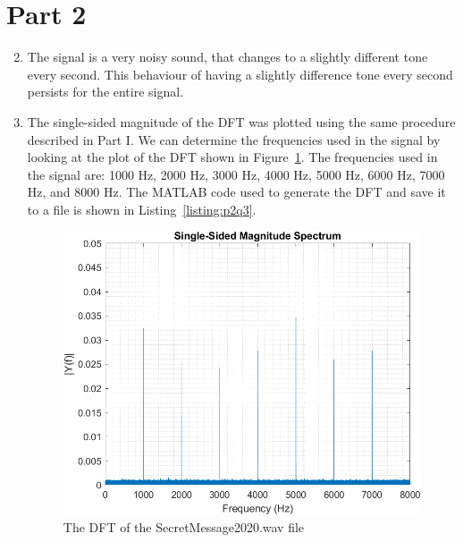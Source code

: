 \documentclass[12pt]{article}
\begin{document}
\section*{Part 2}
\begin{enumerate}
    \setcounter{enumi}{1}
    \item The signal is a very noisy sound, that changes to a slightly different tone every second. This behaviour of having a slightly difference tone every second persists for the entire signal.

    \item The single-sided magnitude of the DFT was plotted using the same procedure described in Part I. We can determine the frequencies used in the signal by looking at the plot of the DFT shown in Figure~\ref{fig:p2q3}. The frequencies used in the signal are: 1000 Hz, 2000 Hz, 3000 Hz, 4000 Hz, 5000 Hz, 6000 Hz, 7000 Hz, and 8000 Hz. The MATLAB code used to generate the DFT and save it to a file is shown in Listing~\ref{listing:p2q3}.
    \begin{figure}[ht]
        \centering
        \includegraphics[width=\textwidth]{part2q3.png}
        \caption{\label{fig:p2q3}The DFT of the SecretMessage2020.wav file}
    \end{figure}
    


\end{enumerate}
\end{document}

